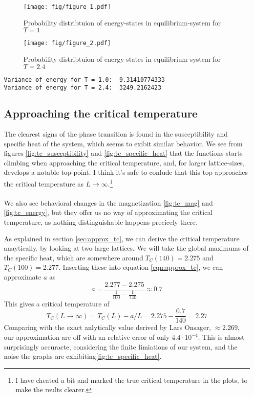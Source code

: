 \documentclass[10pt,a4paper]{article}
\begin{document}
\begin{figure}[H]
\centering
\texttt{[image: fig/figure\_1.pdf]}
\caption{Probability distribtuion of energy-states in equilibrium-system for $T=1$}
\label{fig:prob1}
\end{figure}

\begin{figure}[H]
\centering
\texttt{[image: fig/figure\_2.pdf]}
\caption{Probability distribtuion of energy-states in equilibrium-system for $T=2.4$}
\label{fig:prob2}
\end{figure}


\begin{lstlisting}[basicstyle=\footnotesize, frame=single, caption = Variance $\sigma^2_E$ for probability-distribution , label=lst:variance]
Variance of energy for T = 1.0:  9.31410774333
Variance of energy for T = 2.4:  3249.2162423
\end{lstlisting}


\subsection{Approaching the critical temperature}
The clearest signs of the phase transition is found in the susceptibility and specific heat of the system, which seems to exibit similar behavior. We see from figures \ref{fig:tc_susceptibility} and \ref{fig:tc_specific_heat} that the functions starts climbing when approaching the critical temperature, and, for larger lattice-sizes, develops a notable top-point. I think it's safe to conlude that this top approaches the critical temperature as $L\rightarrow \infty$.\footnote{I have cheated a bit and marked the true critical temperature in the plots, to make the reults clearer.}\\\\
We also see behavioral changes in the magnetization \ref{fig:tc_mag} and \ref{fig:tc_energy}, but they offer us no way of approximating the critical temperature, as nothing distinguishable happens precicely there.

As explained in section \ref{sec:approx_tc}, we can derive the critical temperature anaytically, by looking at two large lattices. We will take the global maximums of the specific heat, which are somewhere around $T_C(140) = 2.275$ and $T_C(100) = 2.277$. Inserting these into equation \ref{eqn:approx_tc}, we can approximate $a$ as
\begin{equation}
a = \frac{2.277 - 2.275}{\frac{1}{100} - \frac{1}{140}} \approx 0.7
\end{equation}
This gives a critical temperature of
\begin{equation}
T_C(L \rightarrow \infty) = T_C(L) - a/L = 2.275 - \frac{0.7}{140} = 2.27
\end{equation}
Comparing with the exact anlytically value derived by Lars Onsager, $\approx 2.269$, our approximation are off with an relative error of only $4.4\cdot 10^{-4}$. This is almost surprisingly accuracte, considering the finite limiations of our system, and the noise the graphs are exhibiting\ref{fig:tc_specific_heat}.
\end{document}
